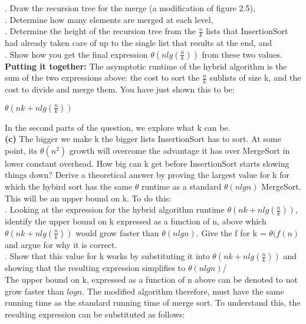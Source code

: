 \documentclass[12pt]{article}
\begin{document}
. Draw the recursion tree for the merge (a modification of figure 2.5), \\
. Determine how many elements are merged at each level, \\
. Determine the height of the recursion tree from the $\frac{n}{k}$ lists that InsertionSort had already taken care of up to the single list that results at the end, and \\
. Show how you get the final expression $\theta(n lg (\frac{n}{k}))$ from these two values. \\
\linebreak
\textbf{Putting it together:} The asymptotic runtime of the hybrid algorithm is the sum of the two expressions above: the cost to sort the $\frac{n}{k}$ sublists of size k, and the cost to divide and merge them. You have just shown this to be: \\
\begin{center}
$\theta(nk + n lg (\frac{n}{k}))$ \\
\end{center}
In the second parts of the 	question, we explore what k can be. \\
\linebreak
\textbf{(c)} The bigger we make k the bigger lists InsertionSort has to sort. At some point, its $\theta(n^2)$ growth will overcome the advantage it has over MergeSort in lower constant overhead. How big can k get before InsertionSort starts slowing things down? Derive a theoretical answer by proving the largest value for k for which the hybird sort has the same $\theta$ runtime as a standard $\theta(n lg n)$ MergeSort. This will be an upper bound on k. To do this: \\
\linebreak
{}. Looking at the expression for the hybrid algorithm runtime $\theta(nk + nlg (\frac{n}{k}))$, identify the upper bound on k expressed as a function of n, above which $\theta(nk + nlg (\frac{n}{k}))$ would grow faster than $\theta(n lg n)$. Give the f for k = $\theta(f(n)$ and argue for why it is correct. \\
. Show that this value for k works by substituting it into $\theta(nk + nlg (\frac{n}{k}))$ and showing that the resulting expression simplifies to $\theta(n lg n)$/ \\
\linebreak
The upper bound on k,  expressed as a function of n above can be denoted to not grow faster than $log n$. The modified algorithm therefore, must have the same running time as the standard running time of merge sort. To understand this,  the resulting expression can be substituted as follows: \\
\end{document}
